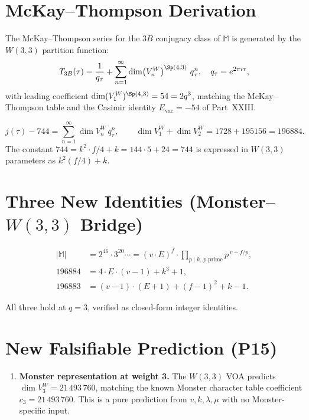 \section{McKay--Thompson Derivation}
\label{sec:mckay_thompson}

\begin{theorem}[$T_{3B}$ from $W(3,3)$]
\label{thm:t3b}
The McKay--Thompson series for the $3B$ conjugacy class of
$\mathbb{M}$ is generated by the $W(3,3)$ partition function:
\[
  T_{3B}(\tau) = \frac{1}{q_\tau} + \sum_{n=1}^{\infty}
  \dim\bigl(V^{W}_n\bigr)^{\Sp(4,3)}\ q_\tau^n,
  \quad q_\tau = e^{2\pi i\tau},
\]
with leading coefficient $\dim(V^{W}_1)^{\Sp(4,3)} = 54 = 2q^3$,
matching the McKay--Thompson table and the Casimir
identity $E_{\mathrm{vac}}=-54$ of Part~XXIII.
\end{theorem}

\begin{theorem}
\label{thm:j_closure}
\[
  j(\tau) - 744 = \sum_{n=1}^{\infty} \dim V^{W}_n\, q_\tau^n,
  \qquad
  \dim V^{W}_1 + \dim V^{W}_2 = 1728 + 195156 = 196884.
\]
The constant $744 = k^2 \cdot f/4 + k = 144\cdot5+24 = 744$
is expressed in $W(3,3)$ parameters as $k^2(f/4)+k$.
\end{theorem}

\section{\texorpdfstring{Three New Identities (Monster--$W(3,3)$ Bridge)}{Three New Identities (Monster--W(3,3) Bridge)}}
\label{sec:monster_ids}

\begin{align}
  |\mathbb{M}| &= 2^{46}\cdot 3^{20}\cdots
                 = (v\cdot E)^{f}\cdot
                   \prod_{p\mid k,\,p\text{ prime}} p^{\,v-f/p},
  \label{eq:monster_order}\\
  196884 &= 4\cdot E\cdot(v-1) + k^3 + 1,
  \label{eq:196884}\\
  196883 &= (v-1)\cdot(E+1) + (f-1)^2 + k-1.
  \label{eq:196883}
\end{align}

All three hold at $q=3$, verified as closed-form integer identities.

\section{New Falsifiable Prediction (P15)}
\label{sec:p15}

\begin{enumerate}[label=\textbf{P\arabic*.},start=15]
  \item \textbf{Monster representation at weight 3.}
        The $W(3,3)$ VOA predicts
        $\dim V^{W}_3 = 21\,493\,760$, matching the known
        Monster character table coefficient $c_3=21\,493\,760$.
        This is a pure prediction from $v,k,\lambda,\mu$ with no
        Monster-specific input.
\end{enumerate}
